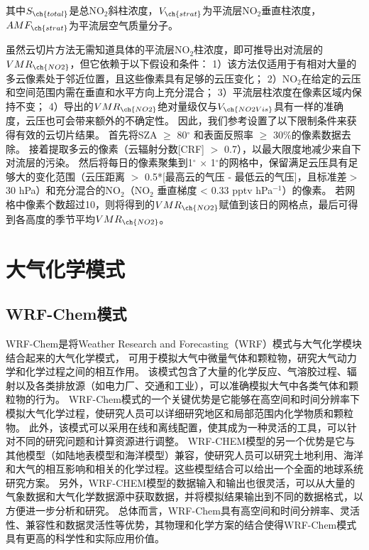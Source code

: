 其中$S_{\ch{total}}$是总NO$_2$斜柱浓度，$V_{\ch{strat}}$为平流层NO$_2$垂直柱浓度，$AMF_{\ch{strat}}$为平流层空气质量分子。


虽然云切片方法无需知道具体的平流层NO$_2$柱浓度，即可推导出对流层的$VMR_{\ch{NO2}}$，但它依赖于以下假设和条件：
1）该方法仅适用于有相对大量的多云像素处于邻近位置，且这些像素具有足够的云压变化；
2）NO$_2$在给定的云压和空间范围内需在垂直和水平方向上充分混合；
3）平流层柱浓度在像素区域内保持不变；
4）导出的$VMR_{\ch{NO2}}$绝对量级仅与$V_{\ch{NO2Vis}}$具有一样的准确度，云压也可会带来额外的不确定性。
因此，我们参考\citet{Marais.2021}设置了以下限制条件来获得有效的云切片结果。
首先将SZA $\geq$ 80$^{\circ}$ 和表面反照率 $\geq$  30\%的像素数据去除。
接着提取多云的像素（云辐射分数[CRF] $>$ 0.7），以最大限度地减少来自下对流层的污染。
然后将每日的像素聚集到1$^{\circ}$ $\times$ 1$^{\circ}$的网格中，保留满足云压具有足够大的变化范围（云压距离 $>$ 0.5*[最高云的气压 - 最低云的气压]，且标准差$>$ 30 hPa）和充分混合的NO$_2$（NO$_2$ 垂直梯度 < 0.33 pptv hPa$^{-1}$）的像素。
若网格中像素个数超过10，则将得到的$VMR_{\ch{NO2}}$赋值到该日的网格点，最后可得到各高度的季节平均$VMR_{\ch{NO2}}$。



\section{大气化学模式}

\subsection{WRF-Chem模式}

WRF-Chem是将Weather Research and Forecasting（WRF）模式与大气化学模块结合起来的大气化学模式，
可用于模拟大气中微量气体和颗粒物，研究大气动力学和化学过程之间的相互作用。
该模式包含了大量的化学反应、气溶胶过程、辐射以及各类排放源（如电力厂、交通和工业），可以准确模拟大气中各类气体和颗粒物的行为。
WRF-Chem模式的一个关键优势是它能够在高空间和时间分辨率下模拟大气化学过程，使研究人员可以详细研究地区和局部范围内化学物质和颗粒物。
此外，该模式可以采用在线和离线配置，使其成为一种灵活的工具，可以针对不同的研究问题和计算资源进行调整。
WRF-CHEM模型的另一个优势是它与其他模型（如陆地表模型和海洋模型）兼容，使研究人员可以研究土地利用、海洋和大气的相互影响和相关的化学过程。这些模型结合可以给出一个全面的地球系统研究方案。
另外，WRF-CHEM模型的数据输入和输出也很灵活，可以从大量的气象数据和大气化学数据源中获取数据，并将模拟结果输出到不同的数据格式，以方便进一步分析和研究。
总体而言，WRF-Chem具有高空间和时间分辨率、灵活性、兼容性和数据灵活性等优势，其物理和化学方案的结合使得WRF-Chem模式具有更高的科学性和实际应用价值。

